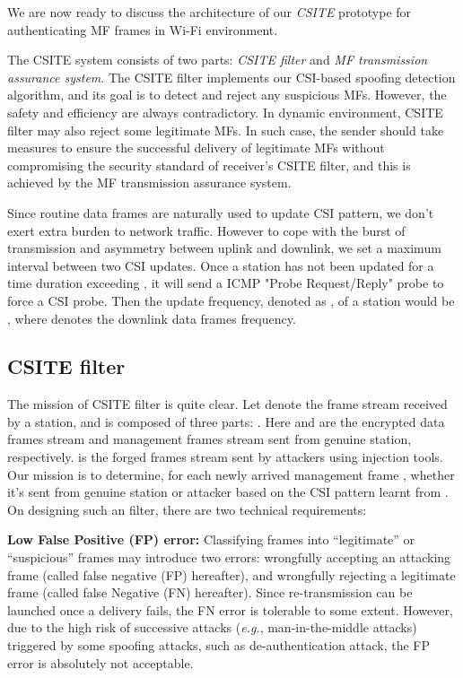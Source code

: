 \documentclass[conference]{IEEEtran}
\def\eg{\textit{e.g.}\xspace}
\begin{document}
We are now ready to discuss the architecture of our
  \textit{CSITE} prototype for authenticating MF frames in Wi-Fi
  environment.

The CSITE system consists of two parts: \emph{CSITE filter}
 and \emph{MF transmission assurance system}.
The CSITE filter implements our CSI-based
 spoofing detection algorithm,
 and its goal is to detect and reject
 any suspicious MFs.
 However, the safety and efficiency are always contradictory.
In dynamic environment, CSITE
 filter may also reject some legitimate MFs.
In such case, the sender
 should take measures to ensure the successful delivery of legitimate
 MFs without compromising the security standard of receiver's CSITE filter, and
 this is achieved by the MF transmission assurance system.




Since routine data frames are naturally used to update CSI pattern, we
don't exert extra burden to network traffic. However to cope with the
burst of transmission and asymmetry between uplink and downlink, we
set a maximum interval  between two CSI updates.
Once a station has not been updated for a time duration exceeding
 , it will send a ICMP "Probe Request/Reply" probe
 to force a CSI probe.
Then the update frequency, denoted as
 , of a station would be , where 
 denotes the downlink data frames frequency.


\subsection{CSITE filter}
\label{subsec:filter}


The mission of CSITE filter is quite clear.
Let  denote the frame stream received by a station, and
 is composed of three parts: . Here  and  are the encrypted data frames
stream and management frames stream sent from genuine station,
respectively.  is the forged frames stream sent by
attackers using injection tools. Our mission is to determine, for each
newly arrived management frame ,  whether it's sent from genuine
station or attacker based on the CSI pattern learnt from .
On designing such an filter, there are two technical requirements:

 \textbf{Low False Positive (FP) error:}
Classifying frames into ``legitimate'' or ``suspicious''
 frames may introduce two errors: wrongfully
 accepting an attacking frame (called false negative (FP) hereafter), and
 wrongfully rejecting a legitimate
 frame (called false Negative (FN) hereafter).
Since re-transmission can be launched once a
   delivery fails, the FN error is tolerable to some extent.
However, due to the high risk of successive attacks (\eg,
 man-in-the-middle attacks) triggered by some
 spoofing attacks, such as de-authentication attack, the FP error
  is absolutely not acceptable.
\end{document}
